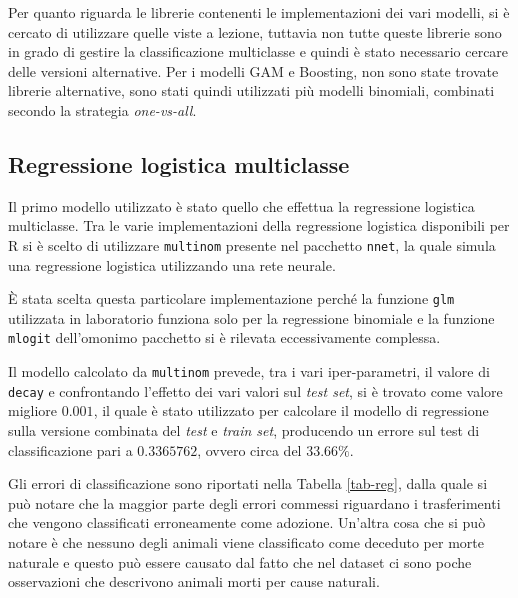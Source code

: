 Per quanto riguarda le librerie contenenti le implementazioni dei vari modelli, si è cercato di utilizzare quelle viste a lezione, tuttavia non tutte queste librerie sono in grado di gestire la classificazione multiclasse e quindi è stato necessario cercare delle versioni alternative. Per i modelli GAM e Boosting, non sono state trovate librerie alternative, sono stati quindi utilizzati più modelli binomiali, combinati secondo la strategia \textit{one-vs-all}.

\subsection{Regressione logistica multiclasse}

Il primo modello utilizzato è stato quello che effettua la regressione logistica multiclasse. Tra le varie implementazioni della regressione logistica disponibili per R si è scelto di utilizzare \texttt{multinom} presente nel pacchetto \texttt{nnet}, la quale simula una regressione logistica utilizzando una rete neurale. 

\`E stata scelta questa particolare implementazione perché la funzione \texttt{glm} utilizzata in laboratorio funziona solo per la regressione binomiale e la funzione \texttt{mlogit} dell'omonimo pacchetto si è rilevata eccessivamente complessa.

Il modello calcolato da \texttt{multinom} prevede, tra i vari iper-parametri, il valore di \texttt{decay} e confrontando l'effetto dei vari valori sul \textit{test set}, si è trovato come valore migliore $0.001$, il quale è stato utilizzato per calcolare il modello di regressione sulla versione combinata del \textit{test} e \textit{train set}, producendo un errore sul test di classificazione pari a $0.3365762$, ovvero circa del $33.66\%$.

Gli errori di classificazione sono riportati nella Tabella \ref{tab-reg}, dalla quale si può notare che la maggior parte degli errori commessi riguardano i trasferimenti che vengono classificati erroneamente come adozione. Un'altra cosa che si può notare è che nessuno degli animali viene classificato come deceduto per morte naturale e questo può essere causato dal fatto che nel dataset ci sono poche osservazioni che descrivono animali morti per cause naturali.

